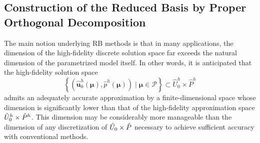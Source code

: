 \documentclass[onecolumn, twoside, a4paper, 11pt]{article}
\begin{document}
\subsection{Construction of the Reduced Basis by Proper Orthogonal Decomposition}
The main notion underlying RB methods is that in many applications, the dimension of the
high-fidelity discrete solution space  far exceeds the natural dimension of the parametrized
model itself. In other words, it is anticipated that the high-fidelity solution space
%
\begin{equation}
  \left\{ (\hat{\bm u}^h_0(\bm \mu), \hat{p}^h(\bm \mu)) \;|\; \bm \mu \in \mathcal{P} \right\}
  \subset \hat{U}_0^h \times \hat{P}^h
  \label{eqn:nspace}
\end{equation}
%
admits an adequately accurate approximation by a finite-dimensional space whose dimension is
significantly lower than that of the high-fidelity approximation space $\smash[t]{\hat{U}_0^h \times \hat{P}^h}$.
This dimension may be
considerably more manageable than the dimension of any discretization of $\smash[t]{\hat{U}_0 \times \hat{P}}$
necessary to achieve sufficient accuracy with conventional methods.
\end{document}

